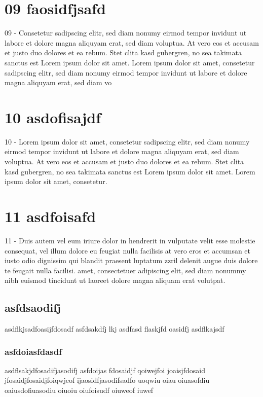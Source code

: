 \documentclass[11pt]{article}
\begin{document}
\section{09 faosidfjsafd}
\label{sec:orgce71b3f}
09 - Consetetur sadipscing elitr, sed diam nonumy eirmod tempor invidunt ut
labore et dolore magna aliquyam erat, sed diam voluptua. At vero eos
et accusam et justo duo dolores et ea rebum. Stet clita kasd
gubergren, no sea takimata sanctus est Lorem ipsum dolor sit amet.
Lorem ipsum dolor sit amet, consetetur sadipscing elitr, sed diam
nonumy eirmod tempor invidunt ut labore et dolore magna aliquyam erat,
sed diam vo
\section{10 asdofisajdf}
\label{sec:org75532a1}
10 - Lorem ipsum dolor sit amet, consetetur sadipscing elitr, sed diam
nonumy eirmod tempor invidunt ut labore et dolore magna aliquyam erat,
sed diam voluptua. At vero eos et accusam et justo duo dolores et ea
rebum. Stet clita kasd gubergren, no sea takimata sanctus est Lorem
ipsum dolor sit amet. Lorem ipsum dolor sit amet, consetetur.
\section{11 asdfoisafd}
\label{sec:orge2988db}
11 - Duis autem vel eum iriure dolor in hendrerit in vulputate velit esse
molestie consequat, vel illum dolore eu feugiat nulla facilisis at
vero eros et accumsan et iusto odio dignissim qui blandit praesent
luptatum zzril delenit augue duis dolore te feugait nulla facilisi.
amet, consectetuer adipiscing elit, sed diam nonummy nibh euismod tincidunt ut laoreet dolore magna aliquam erat
volutpat.
\subsection{asfdsaodifj}
\label{sec:orgd1810b7}
asdflkjsadfoasijfdosadf
asfdsakdfj lkj
asdfasd flaskjfd oasidfj
asdflkajsdf
\subsubsection{asfdoiasfdasdf}
\label{sec:orgd661bd0}
asdflsakjdfosadifjasodifj asfdoijas fdosaidjf qoiwejfoi joaisjfdosaid jfosaidjfosaidjfoiqwjeof ijaosidfjasodifsadfo uoqwiu oiau oiuasofdiu oaiusdofiuasodiu oiuoiu oiufoisudf oiuweof iuwef
\end{document}
